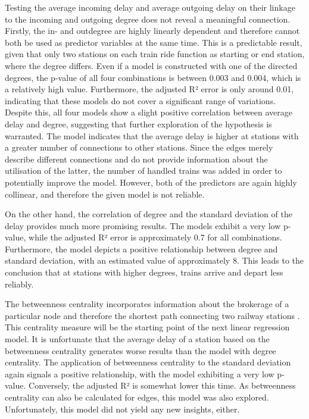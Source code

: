 \documentclass[12pt,a4paper]{article}
\begin{document}
Testing the average incoming delay and average outgoing delay on their linkage to the incoming and outgoing degree does not reveal a meaningful connection. Firstly, the in- and outdegree are highly linearly dependent and therefore cannot both be used as predictor variables at the same time. This is a predictable result, given that only two stations on each train ride function as starting or end station, where the degree differs. Even if a model is constructed with one of the directed degrees, the p-value of all four combinations is between 0.003 and 0.004, which is a relatively high value. Furthermore, the adjusted R² error is only around 0.01, indicating that these models do not cover a significant range of variations. Despite this, all four models show a slight positive correlation between average delay and degree, suggesting that further exploration of the hypothesis is warranted. The model indicates that the average delay is higher at stations with a greater number of connections to other stations. Since the edges merely describe different connections and do not provide information about the utilisation of the latter, the number of handled trains was added in order to potentially improve the model. 
However, both of the predictors are again highly collinear, and therefore the given model is not reliable.

On the other hand, the correlation of degree and the standard deviation of the delay provides much more promising results. The models exhibit a very low p-value, while the adjusted R² error is approximately 0.7 for all combinations. Furthermore, the model depicts a positive relationship between degree and standard deviation, with an estimated value of approximately 8. This leads to the conclusion that at stations with higher degrees, trains arrive and depart less reliably. 

The betweenness centrality incorporates information about the brokerage of a particular node and therefore the shortest path connecting two railway stations \citep[p.~35]{Linton}. This centrality measure will be the starting point of the next linear regression model. It is unfortunate that the average delay of a station based on the betweenness centrality generates worse results than the model with degree centrality. The application of betweenness centrality to the standard deviation again signals a positive relationship, with the model exhibiting a very low p-value. Conversely, the adjusted R² is somewhat lower this time. As betweenness centrality can also be calculated for edges, this model was also explored. Unfortunately, this model did not yield any new insights, either. 
\end{document}
